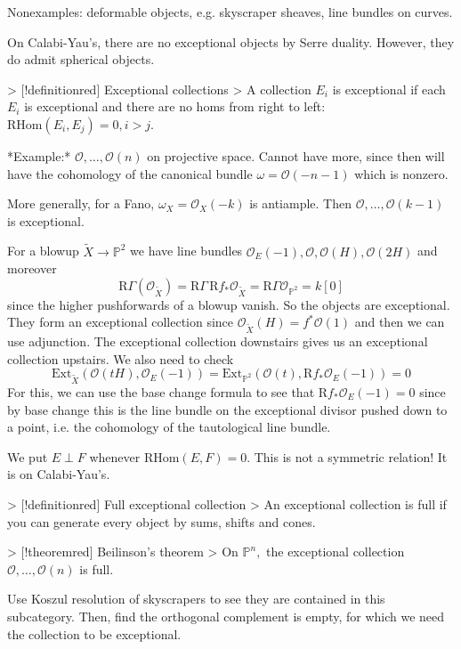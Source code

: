 Nonexamples: deformable objects, e.g. skyscraper sheaves, line bundles on curves.

On Calabi-Yau's, there are no exceptional objects by Serre duality. However, they do admit spherical objects.

> [!definitionred] Exceptional collections
> A collection $E_i$ is exceptional if each $E_i$ is exceptional and there are no homs from right to left: $\mathrm{RHom}(E_{i}, E_{j})=0, i>j$.

*Example:* $\mathcal{O},\dots,\mathcal{O}(n)$ on projective space. Cannot have more, since then will have the cohomology of the canonical bundle $\omega=\mathcal{O}(-n-1)$ which is nonzero.

More generally, for a Fano, $\omega_{X}=\mathcal{O}_{X}(-k)$ is antiample. Then $\mathcal{O}, \dots, \mathcal{O}(k-1)$ is exceptional.

For a blowup $\tilde{X}\xrightarrow{}\mathbb{P}^2$ we have line bundles $\mathcal{O}_{E}(-1), \mathcal{O}, \mathcal{O}(H), \mathcal{O}(2H)$ and moreover $$\mathrm{R}\Gamma(\mathcal{O}_{\tilde{X}})=\mathrm{R}\Gamma \,\mathrm{R}f_{*}\mathcal{O}_{\tilde{ X}}=\mathrm{R}\Gamma \mathcal{O}_{\mathbb{P}^2}=k[0]$$since the higher pushforwards of a blowup vanish. So the objects are exceptional. They form an exceptional collection since $\mathcal{O}_{\tilde{X}}(H)=f^*\mathcal{O}(1)$ and then we can use adjunction. The exceptional collection downstairs gives us an exceptional collection upstairs. We also need to check $$\mathrm{Ext}_{\tilde{ X}}(\mathcal{O}(tH), \mathcal{O}_{E}(-1))=\mathrm{Ext}_{\mathbb{P}^2}(\mathcal{O}(t), \mathrm{R}f_{*}\mathcal{O}_{E}(-1))=0$$For this, we can use the base change formula to see that $\mathrm{R}f_{*}\mathcal{O}_{E}(-1)=0$ since by base change this is the line bundle on the exceptional divisor pushed down to a point, i.e. the cohomology of the tautological line bundle.

We put $E \perp F$ whenever $\mathrm{RHom}(E,F)=0$. This is not a symmetric relation! It is on Calabi-Yau's. 

> [!definitionred] Full exceptional collection
> An exceptional collection is full if you can generate every object by sums, shifts and cones.

> [!theoremred] Beilinson's theorem
> On $\mathbb{P}^n,$ the exceptional collection $\mathcal{O},\dots,\mathcal{O}(n)$ is full.

Use Koszul resolution of skyscrapers to see they are contained in this subcategory. Then, find the orthogonal complement is empty, for which we need the collection to be exceptional.

